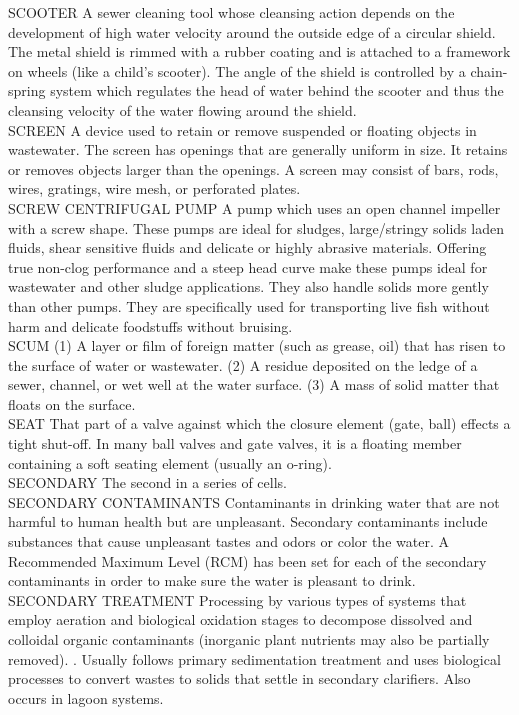 SCOOTER
A sewer cleaning tool whose cleansing action depends on the development of high water velocity around the outside edge of a circular shield. The metal shield is rimmed with a rubber coating and is attached to a framework on wheels (like a child’s scooter). The angle of the shield is controlled by a chain-spring system which regulates the head of water behind the scooter and thus the cleansing velocity of the water flowing around the shield. 
\vspace{0.3cm}\\
SCREEN
A device used to retain or remove suspended or floating objects in wastewater. The screen has openings that are generally uniform in size. It retains or removes objects larger than the openings. A screen may consist of bars, rods, wires, gratings, wire mesh, or perforated plates.
\vspace{0.3cm}\\
SCREW CENTRIFUGAL PUMP
A pump which uses an open channel impeller with a screw shape. These pumps are ideal for sludges, large/stringy solids laden fluids, shear sensitive fluids and delicate or highly abrasive materials. Offering true non-clog performance and a steep head curve make these pumps ideal for wastewater and other sludge applications. They also handle solids more gently than other pumps. They are specifically used for transporting live fish without harm and delicate foodstuffs without bruising.
\vspace{0.3cm}\\
SCUM
(1) A layer or film of foreign matter (such as grease, oil) that has risen to the surface of water or wastewater. (2) A residue deposited on the ledge of a sewer, channel, or wet well at the water surface. (3) A mass of solid matter that floats on the surface. 
\vspace{0.3cm}\\
SEAT
That part of a valve against which the closure element (gate, ball) effects a tight shut-off. In many ball valves and gate valves, it is a floating member containing a soft seating element (usually an o-ring).
\vspace{0.3cm}\\
SECONDARY
The second in a series of cells.
\vspace{0.3cm}\\
SECONDARY CONTAMINANTS
Contaminants in drinking water that are not harmful to human health but are unpleasant. Secondary contaminants include substances that cause unpleasant tastes and odors or color the water. A Recommended Maximum Level (RCM) has been set for each of the secondary contaminants in order to make sure the water is pleasant to drink.
\vspace{0.3cm}\\
SECONDARY TREATMENT
Processing by various types of systems that employ aeration and biological oxidation stages to decompose dissolved and colloidal organic contaminants (inorganic plant nutrients may also be partially removed). . Usually follows primary sedimentation treatment and uses biological processes to convert wastes to solids that settle in secondary clarifiers. Also occurs in lagoon systems.
\vspace{0.3cm}\\


